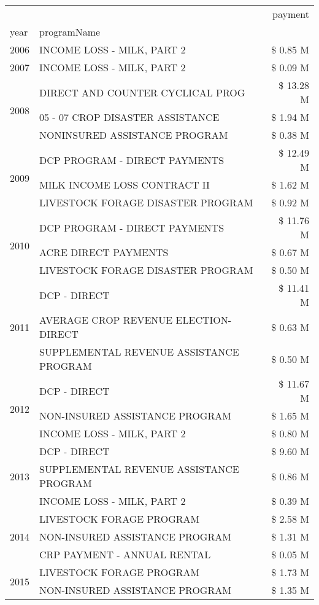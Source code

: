 \begin{tabular}{llr}
\toprule
 &  & payment \\
year & programName &  \\
\midrule
2006 & INCOME LOSS - MILK, PART 2 & \$ 0.85 M \\
\cline{1-3}
2007 & INCOME LOSS - MILK, PART 2 & \$ 0.09 M \\
\cline{1-3}
\multirow[t]{3}{*}{2008} & DIRECT AND COUNTER CYCLICAL PROG & \$ 13.28 M \\
 & 05 - 07 CROP DISASTER ASSISTANCE & \$ 1.94 M \\
 & NONINSURED ASSISTANCE PROGRAM & \$ 0.38 M \\
\cline{1-3}
\multirow[t]{3}{*}{2009} & DCP PROGRAM - DIRECT PAYMENTS & \$ 12.49 M \\
 & MILK INCOME LOSS CONTRACT II & \$ 1.62 M \\
 & LIVESTOCK FORAGE DISASTER  PROGRAM & \$ 0.92 M \\
\cline{1-3}
\multirow[t]{3}{*}{2010} & DCP PROGRAM - DIRECT PAYMENTS & \$ 11.76 M \\
 & ACRE DIRECT PAYMENTS & \$ 0.67 M \\
 & LIVESTOCK FORAGE DISASTER  PROGRAM & \$ 0.50 M \\
\cline{1-3}
\multirow[t]{3}{*}{2011} & DCP - DIRECT & \$ 11.41 M \\
 & AVERAGE CROP REVENUE ELECTION-DIRECT & \$ 0.63 M \\
 & SUPPLEMENTAL REVENUE ASSISTANCE PROGRAM & \$ 0.50 M \\
\cline{1-3}
\multirow[t]{3}{*}{2012} & DCP - DIRECT & \$ 11.67 M \\
 & NON-INSURED ASSISTANCE PROGRAM & \$ 1.65 M \\
 & INCOME LOSS - MILK, PART 2 & \$ 0.80 M \\
\cline{1-3}
\multirow[t]{3}{*}{2013} & DCP - DIRECT & \$ 9.60 M \\
 & SUPPLEMENTAL REVENUE ASSISTANCE PROGRAM & \$ 0.86 M \\
 & INCOME LOSS - MILK, PART 2 & \$ 0.39 M \\
\cline{1-3}
\multirow[t]{3}{*}{2014} & LIVESTOCK FORAGE PROGRAM & \$ 2.58 M \\
 & NON-INSURED ASSISTANCE PROGRAM & \$ 1.31 M \\
 & CRP PAYMENT - ANNUAL RENTAL & \$ 0.05 M \\
\cline{1-3}
\multirow[t]{3}{*}{2015} & LIVESTOCK FORAGE PROGRAM & \$ 1.73 M \\
 & NON-INSURED ASSISTANCE PROGRAM & \$ 1.35 M \\

\end{tabular}
